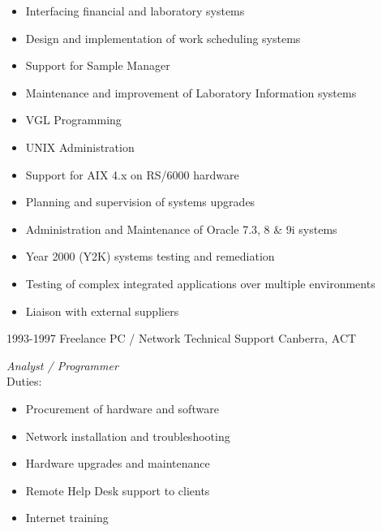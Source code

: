 \documentclass[]{friggeri-cv} %
\begin{document}
\begin{entrylist}
{\begin{itemize}
\item Interfacing financial and laboratory systems
\item Design and implementation of work scheduling systems
\item Support for Sample Manager
\item Maintenance and improvement of Laboratory Information systems
\item VGL Programming
\item UNIX Administration
\item Support for AIX 4.x on RS/6000 hardware
\item Planning and supervision of systems upgrades
\item Administration and Maintenance of Oracle 7.3, 8 \& 9i systems
\item Year 2000 (Y2K) systems testing and remediation
\item Testing of complex integrated applications over multiple environments
\item Liaison with external suppliers
\end{itemize}}
\entry
{1993-1997}
{Freelance PC / Network Technical Support}
{Canberra, ACT}
{\emph{Analyst / Programmer} \\
Duties:
\begin{itemize}
\item Procurement of hardware and software
\item Network installation and troubleshooting
\item Hardware upgrades and maintenance
\item Remote Help Desk support to clients
\item Internet training
\end{itemize}}
\end{entrylist}

\end{document}

